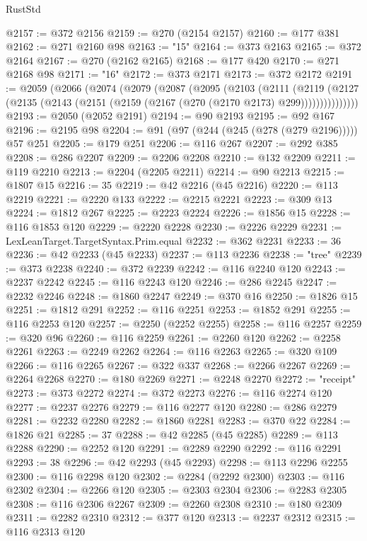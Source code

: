 \begin{lexlean}{RustStd}
\begin{coremodule}
@2157 := @372 @2156
@2159 := @270 (@2154 @2157)
@2160 := @177 @381
@2162 := @271 @2160 @98
@2163 := "15"
@2164 := @373 @2163
@2165 := @372 @2164
@2167 := @270 (@2162 @2165)
@2168 := @177 @420
@2170 := @271 @2168 @98
@2171 := "16"
@2172 := @373 @2171
@2173 := @372 @2172
@2191 := @2059
    (@2066
      (@2074
        (@2079
          (@2087
            (@2095
              (@2103
                (@2111
                  (@2119
                    (@2127
                      (@2135 (@2143 (@2151 (@2159 (@2167 (@270 (@2170 @2173) @299)))))))))))))))
@2193 := @2050 (@2052 @2191)
@2194 := @90 @2193
@2195 := @92 @167
@2196 := @2195 @98
@2204 := @91 (@97 (@244 (@245 (@278 (@279 @2196))))) @57 @251
@2205 := @179 @251
@2206 := @116 @267
@2207 := @292 @385
@2208 := @286 @2207
@2209 := @2206 @2208
@2210 := @132 @2209
@2211 := @119 @2210
@2213 := @2204 (@2205 @2211)
@2214 := @90 @2213
@2215 := @1807 @15
@2216 := 35
@2219 := @42 @2216 (@45 @2216)
@2220 := @113 @2219
@2221 := @2220 @133
@2222 := @2215 @2221
@2223 := @309 @13
@2224 := @1812 @267
@2225 := @2223 @2224
@2226 := @1856 @15
@2228 := @116 @1853 @120
@2229 := @2220 @2228
@2230 := @2226 @2229
@2231 := LexLeanTarget.TargetSyntax.Prim.equal
@2232 := @362 @2231
@2233 := 36
@2236 := @42 @2233 (@45 @2233)
@2237 := @113 @2236
@2238 := "tree"
@2239 := @373 @2238
@2240 := @372 @2239
@2242 := @116 @2240 @120
@2243 := @2237 @2242
@2245 := @116 @2243 @120
@2246 := @286 @2245
@2247 := @2232 @2246
@2248 := @1860 @2247
@2249 := @370 @16
@2250 := @1826 @15
@2251 := @1812 @291
@2252 := @116 @2251
@2253 := @1852 @291
@2255 := @116 @2253 @120
@2257 := @2250 (@2252 @2255)
@2258 := @116 @2257
@2259 := @320 @96
@2260 := @116 @2259
@2261 := @2260 @120
@2262 := @2258 @2261
@2263 := @2249 @2262
@2264 := @116 @2263
@2265 := @320 @109
@2266 := @116 @2265
@2267 := @322 @337
@2268 := @2266 @2267
@2269 := @2264 @2268
@2270 := @180 @2269
@2271 := @2248 @2270
@2272 := "receipt"
@2273 := @373 @2272
@2274 := @372 @2273
@2276 := @116 @2274 @120
@2277 := @2237 @2276
@2279 := @116 @2277 @120
@2280 := @286 @2279
@2281 := @2232 @2280
@2282 := @1860 @2281
@2283 := @370 @22
@2284 := @1826 @21
@2285 := 37
@2288 := @42 @2285 (@45 @2285)
@2289 := @113 @2288
@2290 := @2252 @120
@2291 := @2289 @2290
@2292 := @116 @2291
@2293 := 38
@2296 := @42 @2293 (@45 @2293)
@2298 := @113 @2296 @2255
@2300 := @116 @2298 @120
@2302 := @2284 (@2292 @2300)
@2303 := @116 @2302
@2304 := @2266 @120
@2305 := @2303 @2304
@2306 := @2283 @2305
@2308 := @116 @2306 @2267
@2309 := @2260 @2308
@2310 := @180 @2309
@2311 := @2282 @2310
@2312 := @377 @120
@2313 := @2237 @2312
@2315 := @116 @2313 @120

\end{coremodule}
\end{lexlean}
